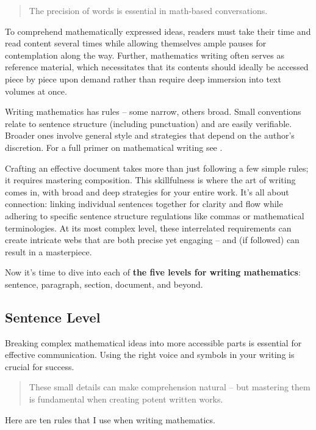 \documentclass[
  twoside,
  12pt,
  letterpaper,
  fleqn]{article}
\begin{document}
\begin{quote}
The precision of words is essential in math-based conversations.
\end{quote}

To comprehend mathematically expressed ideas, readers must take their
time and read content several times while allowing themselves ample
pauses for contemplation along the way. Further, mathematics writing
often serves as reference material, which necessitates that its contents
should ideally be accessed piece by piece upon demand rather than
require deep immersion into text volumes at once.

Writing mathematics has rules -- some narrow, others broad. Small
conventions relate to sentence structure (including punctuation) and are
easily verifiable. Broader ones involve general style and strategies
that depend on the author's discretion. For a full primer on
mathematical writing see \textcite{krantz2017primer}.

Crafting an effective document takes more than just following a few
simple rules; it requires mastering composition. This skillfulness is
where the art of writing comes in, with broad and deep strategies for
your entire work. It's all about connection: linking individual
sentences together for clarity and flow while adhering to specific
sentence structure regulations like commas or mathematical
terminologies. At its most complex level, these interrelated
requirements can create intricate webs that are both precise yet
engaging -- and (if followed) can result in a masterpiece.

Now it's time to dive into each of \textbf{the five levels for writing
mathematics}: sentence, paragraph, section, document, and beyond.

\hypertarget{sentence-level}{%
\subsection{Sentence Level}\label{sentence-level}}

Breaking complex mathematical ideas into more accessible parts is
essential for effective communication. Using the right voice and symbols
in your writing is crucial for success.

\begin{quote}
These small details can make comprehension natural -- but mastering them
is fundamental when creating potent written works.
\end{quote}

Here are ten rules that I use when writing mathematics.
\end{document}
